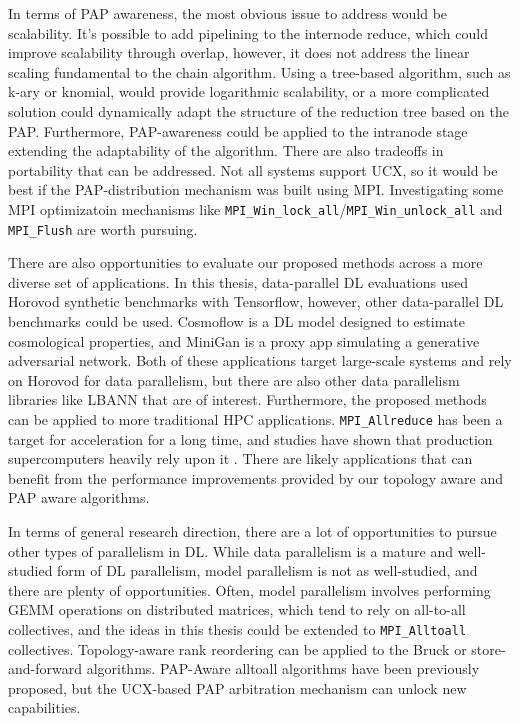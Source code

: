 In terms of \gls{PAP} awareness, the most obvious issue to address would be scalability.
It's possible to add pipelining to the internode reduce, which could improve scalability through overlap, however, it does not address the linear scaling fundamental to the chain algorithm.
Using a tree-based algorithm, such as k-ary or knomial, would provide logarithmic scalability, or a more complicated solution could dynamically adapt the structure of the reduction tree based on the \gls{PAP}. 
Furthermore, \gls{PAP}-awareness could be applied to the intranode stage extending the adaptability of the algorithm.
There are also tradeoffs in portability that can be addressed. 
Not all systems support \gls{UCX}, so it would be best if the \gls{PAP}-distribution mechanism was built using \gls{MPI}.
Investigating some \gls{MPI} optimizatoin mechanisms like \texttt{MPI\_Win\_lock\_all}/\texttt{MPI\_Win\_unlock\_all} and \texttt{MPI\_Flush} are worth pursuing. 

There are also opportunities to evaluate our proposed methods across a more diverse set of applications.  
In this thesis, data-parallel \gls{DL} evaluations used Horovod synthetic benchmarks with Tensorflow, however, other data-parallel \gls{DL} benchmarks could be used.
Cosmoflow \cite{Mathuriya2019Cosmoflow} is a \gls{DL} model designed to estimate cosmological properties, and MiniGan \cite{MiniGan} is a proxy app simulating a generative adversarial network.
Both of these applications target large-scale systems and rely on Horovod for data parallelism, but there are also other data parallelism libraries like LBANN \cite{VanEssen2015LBANN} that are of interest.
Furthermore, the proposed methods can be applied to more traditional \gls{HPC} applications.
\texttt{MPI\_Allreduce} has been a target for acceleration for a long time, and studies have shown that production supercomputers heavily rely upon it \cite{Chunduri2018CharacterizeMPIonProd}.
There are likely applications that can benefit from the performance improvements provided by our topology aware and \gls{PAP} aware algorithms.

In terms of general research direction, there are a lot of opportunities to pursue other types of parallelism in \gls{DL}.
While data parallelism is a mature and well-studied form of \gls{DL} parallelism, model parallelism is not as well-studied, and there are plenty of opportunities.
Often, model parallelism involves performing \gls{GEMM} operations on distributed matrices, which tend to rely on all-to-all collectives, and the ideas in this thesis could be extended to \texttt{MPI\_Alltoall} collectives.
Topology-aware rank reordering can be applied to the Bruck or store-and-forward algorithms.
\gls{PAP}-Aware alltoall algorithms have been previously proposed, but the \gls{UCX}-based PAP arbitration mechanism can unlock new capabilities.


